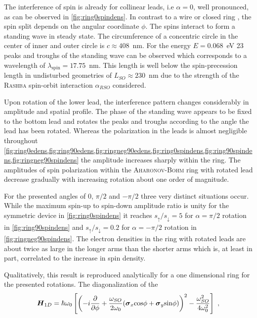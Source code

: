 The interference of spin is already for collinear leads, i.e $\alpha=0$, well pronounced, as can be observed in \cref{fig:ring0spindens}. In contrast to a wire or closed ring \cite{PhysRevB.82.165322}, the spin split depends on the angular coordinate $\phi$.
The spins interact to form a standing wave in steady state. The circumference of a concentric circle in the center of inner and outer circle is $c\approx 408$~nm. For the energy $E=0.068$~eV 23 peaks and troughs of the standing wave can be observed which corresponds to a wavelength of $\lambda_{\text{spin}}=17.75$~nm. This length is well below the spin-precession length in undisturbed geometries of $L_{SO}\approx230$~nm due to the strength of the \textsc{Rashba} spin-orbit interaction $\alpha_{RSO}$ considered.\par
Upon rotation of the lower lead, the interference pattern changes considerably in amplitude and spatial profile. The phase of the standing wave appears to be fixed to the bottom lead and rotates the peaks and troughs according to the angle the lead has been rotated. Whereas the polarization in the leads is almost negligible throughout \cref{fig:ring0edens,fig:ring90edens,fig:ringneg90edens,fig:ring0spindens,fig:ring90spindens,fig:ringneg90spindens} the amplitude increases sharply within the ring. The amplitudes of spin polarization within the \textsc{Aharonov-Bohm} ring with rotated lead decrease gradually with increasing rotation about one order of magnitude.\par
For the presented angles of 0, $\pi/2$ and $-\pi/2$ three very distinct situations occur. While the maximum spin-up to spin-down amplitude ratio is unity for the symmetric device in \cref{fig:ring0spindens} it reaches $s_{\uparrow}/s_{\downarrow}=5$ for $\alpha=\pi/2$ rotation in \cref{fig:ring90spindens} and $s_{\uparrow}/s_{\downarrow}=0.2$ for $\alpha=-\pi/2$ rotation in \cref{fig:ringneg90spindens}. The electron densities in the ring with rotated leads are about twice as large in the longer arms than the shorter arms which is, at least in part, correlated to the increase in spin density.\par
Qualitatively, this result is reproduced analytically for a one dimensional ring for the presented rotations. The diagonalization of the \hamil{} \begin{align}
\mat{H}_{1D}=\hbar\omega_0 \left[\left(-i\pd{}{\phi}+\frac{\omega_{SO}}{2\omega_{0}} (\mat{\sigma}_x\text{cos}\phi+\mat{\sigma}_y\text{sin}\phi)\right)^2-\frac{\omega_{SO}^2}{4\omega_0^2}\right]\ ,
\end{align}
